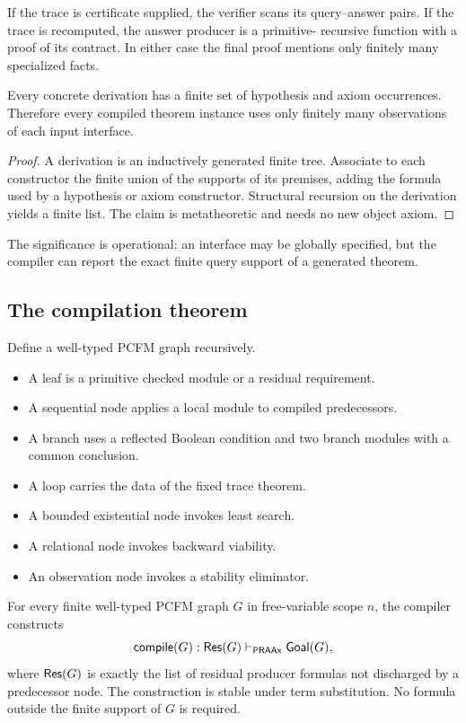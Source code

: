 If the trace is certificate supplied, the verifier scans its query--answer
pairs.  If the trace is recomputed, the answer producer is a primitive-
recursive function with a proof of its contract.  In either case the final
proof mentions only finitely many specialized facts.

\begin{lemma}
Every concrete  derivation has a finite set of hypothesis and
axiom occurrences.  Therefore every compiled theorem instance uses only
finitely many observations of each input interface.
\end{lemma}

\begin{proof}
A derivation is an inductively generated finite tree.  Associate to each
constructor the finite union of the supports of its premises, adding the
formula used by a hypothesis or axiom constructor.  Structural recursion on
the derivation yields a finite list.  The claim is metatheoretic and needs no
new object axiom.
\end{proof}

The significance is operational: an interface may be globally specified, but
the compiler can report the exact finite query support of a generated theorem.

\subsection{The compilation theorem}

Define a well-typed PCFM graph recursively.

\begin{itemize}
\item A leaf is a primitive checked module or a residual requirement.
\item A sequential node applies a local module to compiled predecessors.
\item A branch uses a reflected Boolean condition and two branch modules with
a common conclusion.
\item A loop carries the data of the fixed trace theorem.
\item A bounded existential node invokes least search.
\item A relational node invokes backward viability.
\item An observation node invokes a stability eliminator.
\end{itemize}

\begin{theorem}
For every finite well-typed PCFM graph \(G\) in free-variable scope \(n\), the
compiler constructs
\[
   \mathsf{compile}(G):
   \mathsf{Res}(G)\vdash_{\mathsf{PRAAx}}\mathsf{Goal}(G),
\]
where \(\mathsf{Res}(G)\) is exactly the list of residual producer formulas not
discharged by a predecessor node.  The construction is stable under term
substitution.  No formula outside the finite support of \(G\) is required.
\end{theorem}


